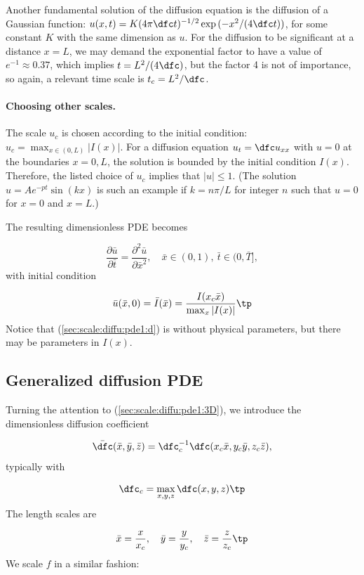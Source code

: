 \documentclass[graybox,envcountchap,sectrefs,final]{svmonodo}
\begin{document}
Another fundamental solution of the diffusion equation is the
diffusion of a Gaussian function: $u(x,t)=K(4\pi\dfc
t)^{-1/2}\exp{(-x^2/(4\dfc t))}$, for some constant $K$ with
the same dimension as $u$. For the diffusion to be significant
at a distance $x=L$, we may demand the exponential factor to have a
value of $e^{-1}\approx 0.37$, which implies $t=L^2/(4\dfc)$, but the
factor 4 is not of importance, so again, a relevant time scale is
$t_c=L^2/\dfc$.

\paragraph{Choosing other scales.}
The scale $u_c$ is chosen according to the initial condition:
$u_c=\max_{x\in(0,L)}|I(x)|$. For a diffusion equation $u_t=\dfc u_{xx}$
with $u=0$ at the boundaries $x=0,L$, the solution is bounded by
the initial condition $I(x)$. Therefore, the listed choice of $u_c$
implies that
$|u|\leq 1$. (The solution $u=Ae^{-pt}\sin (kx)$ is such an example
if $k=n\pi/L$ for integer $n$ such that $u=0$ for $x=0$ and $x=L$.)

The resulting dimensionless PDE becomes

\begin{equation}
\frac{\partial \bar u}{\partial \bar t} =
\frac{\partial^2 \bar u}{\partial \bar x^2}, \quad  \bar x\in (0,1),\ \bar t\in (0,\bar T],
\label{sec:scale:diffu:pde1:d}
\end{equation}
with initial condition

\[ \bar u(\bar x, 0) = \bar I(\bar x) = \frac{I(x_c\bar x)}{\max_x |I(x)|}\tp\]
Notice that (\ref{sec:scale:diffu:pde1:d}) is without physical parameters,
but there may be parameters in $I(x)$.

\subsection{Generalized diffusion PDE}

Turning the attention to (\ref{sec:scale:diffu:pde1:3D}), we introduce
the dimensionless diffusion coefficient

\[ \bar\dfc(\bar x,\bar y,\bar z) =
\dfc_c^{-1}\dfc (x_c\bar x, y_c\bar y, z_c\bar z),\]
typically with

\[ \dfc_c = \max_{x,y,z}\dfc(x,y,z)\tp\]
The length scales are

\[ \bar x = \frac{x}{x_c},\quad \bar y = \frac{y}{y_c},\quad
\bar z = \frac{z}{z_c}\tp
\]
We scale $f$ in a similar fashion:
\end{document}
